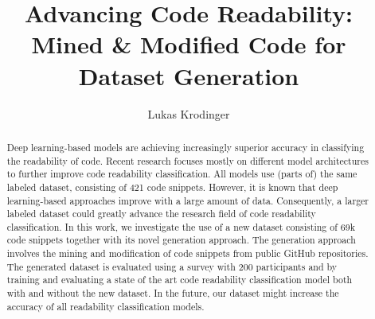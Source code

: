 \documentclass[%
class=scrreprt,
chapterprefix=false,%
open=right,%
twoside=false,%
paper=a4,%
logofile={Logo\_zentral\_farbig\_EN.png},%
thesistype=master,%
UKenglish,%
]{se2thesis}
\author{Lukas Krodinger}
\title{Advancing Code Readability: Mined \& Modified Code for Dataset Generation}
\institute{Chair of Software Engineering II}
\theoremstyle{definition}
\newcommand{\numSamples}{69k\xspace}
\begin{document}
	
	\frontmatter
	
	\maketitle
	
	\begin{abstract}
		
		
		Deep learning-based models are achieving increasingly superior accuracy in classifying the readability of code.
		Recent research focuses mostly on different model architectures to further improve code readability classification. All models use (parts of) the same labeled dataset, consisting of 421 code snippets.
		However, it is known that deep learning-based approaches improve with a large amount of data.
		Consequently, a larger labeled dataset could greatly advance the research field of code readability classification.
		In this work, we investigate the use of a new dataset consisting of \numSamples code snippets together with its novel generation approach.
		The generation approach involves the mining and modification of code snippets from public GitHub repositories. The generated dataset is evaluated using a survey with 200 participants and by training and evaluating a state of the art code readability classification model both with and without the new dataset.
		In the future, our dataset might increase the accuracy of all readability classification models.
		

	\end{abstract}
	
\end{document}
